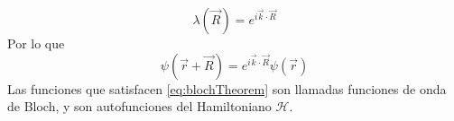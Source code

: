 \begin{equation}
	\lambda(\vec{R}) = e^{i\vec{k}\cdot \vec{R}}
\end{equation}
Por lo que
\begin{equation}
	\psi(\vec{r} + \vec{R}) = e^{i\vec{k}\cdot \vec{R}}\psi(\vec{r})\label{eq:blochTheorem}
\end{equation}
Las funciones que satisfacen \eqref{eq:blochTheorem} son llamadas funciones de onda de Bloch, y son autofunciones del Hamiltoniano $\mathcal{H}$.

